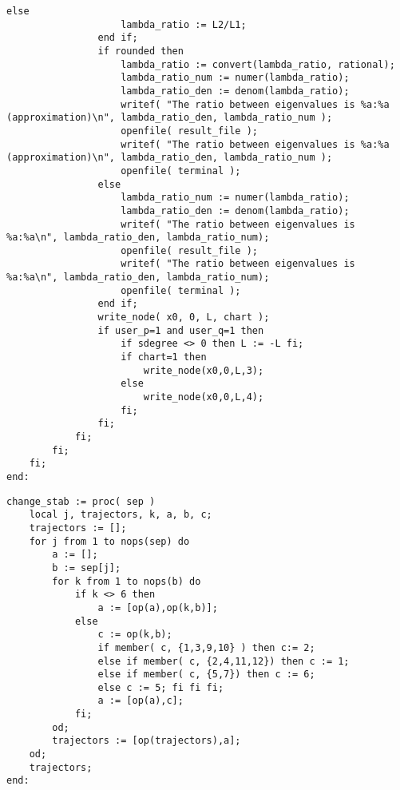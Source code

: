 \documentclass[a4paper,10pt]{article}
\begin{document}
\begin{lstlisting}[name=infinity]
                else
                    lambda_ratio := L2/L1;
                end if;
                if rounded then
                    lambda_ratio := convert(lambda_ratio, rational);
                    lambda_ratio_num := numer(lambda_ratio);
                    lambda_ratio_den := denom(lambda_ratio);
                    writef( "The ratio between eigenvalues is %a:%a (approximation)\n", lambda_ratio_den, lambda_ratio_num );
                    openfile( result_file );
                    writef( "The ratio between eigenvalues is %a:%a (approximation)\n", lambda_ratio_den, lambda_ratio_num );
                    openfile( terminal );
                else
                    lambda_ratio_num := numer(lambda_ratio);
                    lambda_ratio_den := denom(lambda_ratio);
                    writef( "The ratio between eigenvalues is %a:%a\n", lambda_ratio_den, lambda_ratio_num);
                    openfile( result_file );
                    writef( "The ratio between eigenvalues is %a:%a\n", lambda_ratio_den, lambda_ratio_num);
                    openfile( terminal );
                end if;
                write_node( x0, 0, L, chart );
                if user_p=1 and user_q=1 then
                    if sdegree <> 0 then L := -L fi;
                    if chart=1 then
                        write_node(x0,0,L,3);
                    else
                        write_node(x0,0,L,4);
                    fi;
                fi;
            fi;
        fi;
    fi;
end:
\end{lstlisting}

\begin{lstlisting}[name=infinity]
change_stab := proc( sep )
    local j, trajectors, k, a, b, c;
    trajectors := [];
    for j from 1 to nops(sep) do
        a := [];
        b := sep[j];
        for k from 1 to nops(b) do
            if k <> 6 then
                a := [op(a),op(k,b)];
            else
                c := op(k,b);
                if member( c, {1,3,9,10} ) then c:= 2;
                else if member( c, {2,4,11,12}) then c := 1;
                else if member( c, {5,7}) then c := 6;
                else c := 5; fi fi fi;
                a := [op(a),c];
            fi;
        od;
        trajectors := [op(trajectors),a];
    od;
    trajectors;
end:
\end{lstlisting}
\end{document}
